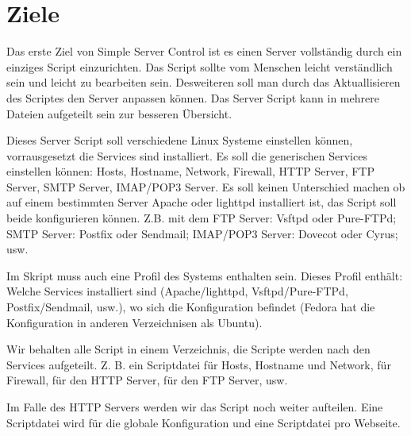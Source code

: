 \section{Ziele}

Das erste Ziel von Simple Server Control ist es einen Server vollständig
durch ein einziges Script einzurichten. Das Script sollte vom Menschen leicht
verständlich sein und leicht zu bearbeiten sein. Desweiteren soll man durch das
Aktuallisieren des Scriptes den Server anpassen können. Das Server Script kann
in mehrere Dateien aufgeteilt sein zur besseren Übersicht.

Dieses Server Script soll verschiedene Linux Systeme einstellen können,
vorrausgesetzt die Services sind installiert. Es soll die generischen Services
einstellen können: Hosts, Hostname, Network, Firewall, HTTP Server, FTP Server,
SMTP Server, IMAP/POP3 Server. Es soll keinen Unterschied machen ob auf einem
bestimmten Server Apache oder lighttpd installiert ist, das Script soll beide
konfigurieren können. Z.B. mit dem FTP Server: Vsftpd oder Pure-FTPd; SMTP
Server: Postfix oder Sendmail; IMAP/POP3 Server: Dovecot oder Cyrus; usw.

Im Skript muss auch eine Profil des Systems enthalten sein. Dieses
Profil enthält: Welche Services installiert sind (Apache/lighttpd,
Vsftpd/Pure-FTPd, Postfix/Sendmail, usw.), wo sich die Konfiguration befindet
(Fedora hat die Konfiguration in anderen Verzeichnisen als Ubuntu).

Wir behalten alle Script in einem Verzeichnis, die Scripte werden nach den
Services aufgeteilt. Z. B. ein Scriptdatei für Hosts, Hostname und Network, für
Firewall, für den HTTP Server, für den FTP Server, usw.

\begin{asparaitem}
\item {}
\item {}
\item {}
\item {}
\item {}
\item {}
\item {}
\end{asparaitem}

Im Falle des HTTP Servers werden wir das Script noch weiter aufteilen. Eine
Scriptdatei wird für die globale Konfiguration und eine Scriptdatei pro
Webseite.

\begin{asparaitem}
\item {}
\item {}
\end{asparaitem}

